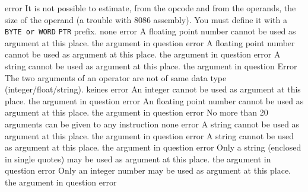 \documentclass[12pt,twoside]{report}
\newcommand{\tty}[1]{{\tt #1}}
\begin{document}
\begin{description}
               {error}
               {It is not possible to estimate, from the opcode and from
                the operands, the size of the operand (a trouble with
                8086 assembly). You must define it with a \tty{BYTE or WORD}
                \tty{PTR} prefix.}
               {none}
               {error}
               {A floating point number cannot be used as argument at this place.}
               {the argument in question}
               {error}
               {A floating point number cannot be used as argument at this place.}
               {the argument in question}
               {error}
               {A string cannot be used as argument at this place.}
               {the argument in question}
               {Error}
               {The two arguments of an operator are not of same
                data type (integer/\-float/\-string).}
               {keines}
               {error}
               {An integer cannot be used as argument at this place.}
               {the argument in question}
               {error}
               {An floating point number cannot be used as argument at this place.}
               {the argument in question}
               {error}
               {No more than 20 arguments can be given to any instruction}
               {none}
               {error}
               {A string cannot be used as argument at this place.}
               {the argument in question}
               {error}
               {A string cannot be used as argument at this place.}
               {the argument in question}
               {error}
               {Only a string (enclosed in single quotes) may be used as
                argument at this place.}
               {the argument in question}
               {error}
               {Only an integer number may be used as argument at this place.}
               {the argument in question}
               {error}

\end{description}
\end{document}
